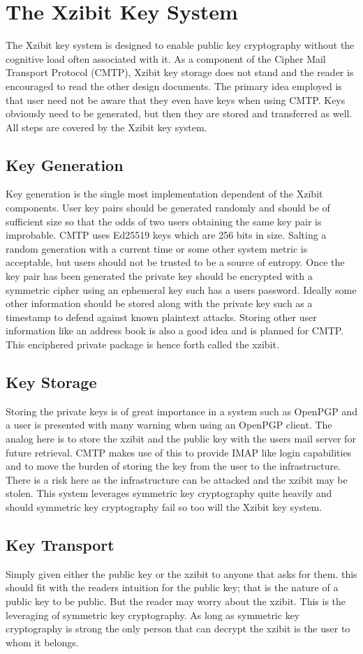 \documentclass[a4paper,11pt]{article}
\begin{document}
\section{The Xzibit Key System}
The Xzibit key system is designed to enable public key cryptography without the cognitive load often associated with it. As a component of the Cipher Mail Transport Protocol (CMTP), Xzibit key storage does not stand and the reader is encouraged to read the other design documents. The primary idea employed is that user need not be aware that they even have keys when using CMTP. Keys obviously need to be generated, but then they are stored and transferred as well. All steps are covered by the Xzibit key system.
\subsection{Key Generation}
Key generation is the single most implementation dependent of the Xzibit components. User key pairs should be generated randomly and should be of sufficient size so that the odds of two users obtaining the same key pair is improbable. CMTP uses Ed25519 keys which are 256 bits in size. Salting a random generation with a current time or some other system metric is acceptable, but users should not be trusted to be a source of entropy. Once the key pair has been generated the private key should be encrypted with a symmetric cipher using an ephemeral key such has a users password. Ideally some other information should be stored along with the private key such as a timestamp to defend against known plaintext attacks. Storing other user information like an address book is also a good idea and is planned for CMTP. This enciphered private package is hence forth called the xzibit.
\subsection{Key Storage}
Storing the private keys is of great importance in a system such as OpenPGP and a user is presented with many warning when using an OpenPGP client. The analog here is to store the xzibit and the public key with the users mail server for future retrieval. CMTP makes use of this to provide IMAP like login capabilities and to move the burden of storing the key from the user to the infrastructure. There is a risk here as the infrastructure can be attacked and the xzibit may be stolen. This system leverages symmetric key cryptography quite heavily and should symmetric key cryptography fail so too will the Xzibit key system.
\subsection{Key Transport}
Simply given either the public key or the xzibit to anyone that asks for them. this should fit with the readers intuition for the public key; that is the nature of a public key to be public. But the reader may worry about the xzibit. This is the leveraging of symmetric key cryptography. As long as symmetric key cryptography is strong the only person that can decrypt the xzibit is the user to whom it belongs.
\end{document}
